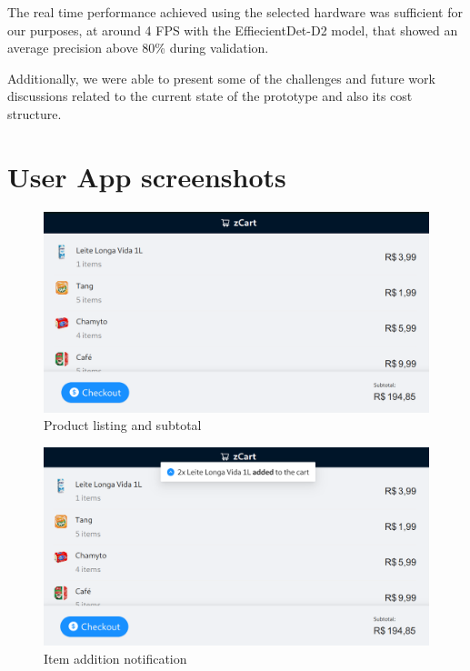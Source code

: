 \documentclass[openright]{normas-utf-tex} %
\begin{document}
The real time performance achieved using the selected hardware was sufficient
for our purposes, at around 4 FPS with the EffiecientDet-D2 model, that showed an
average precision above 80\% during validation.

Additionally, we were able to present some of the challenges and future work
discussions related to the current state of the prototype and also its cost
structure.


\clearpage
\label{bibstart}

\label{bibend}

\setcounter{chapter}{0}
\apendice
\chapter{User App screenshots}
\label{ap:userapp}

\begin{figure}[H]
	\centering
	\includegraphics[width=1\textwidth]{./images/userapp.png}
	\caption[]{Product listing and subtotal}
\end{figure}

\begin{figure}[H]
	\centering
	\includegraphics[width=1\textwidth]{./images/userapp2.png}
	\caption[]{Item addition notification}
\end{figure}
\end{document}
